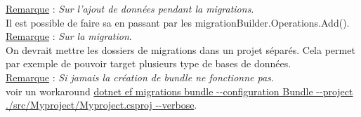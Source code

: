 \documentclass[a4paper,12pt,twoside]{article}
\newcommand{\incode}[1]{{\footnotesize\ttfamily #1}} %
\newcommand{\rem}[2]{\noindent\underline{Remarque} : \textit{#1}.\\ \indent #2}
\begin{document}
\rem{Sur l'ajout de données pendant la migrations}{Il est possible de faire sa en passant par les \incode{migrationBuilder.Operations.Add()}.}\\

\rem{Sur la migration}{On devrait mettre les dossiers de migrations dans un projet séparés. Cela permet par exemple de pouvoir target plusieurs type de bases de données.}\\

\rem{Si jamais la création de bundle ne fonctionne pas}{voir un workaround \url{dotnet ef migrations bundle --configuration Bundle --project ./src/Myproject/Myproject.csproj --verbose}.}\\

\newpage
\printglossary[type=\acronymtype]%
\glsaddallunused %
\printglossary[type = main,nonumberlist]%
\end{document}
